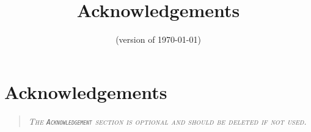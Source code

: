 \documentclass[../thesis]{subfiles}
\title{Acknowledgements}
\date{(version of \today)} \author{}
\begin{document}

\chapter{Acknowledgements}
\begin{quote}
\centering \scshape \itshape The \texttt{Acknowledgement} section is optional and should be deleted if not used.
\end{quote}
\end{document}

